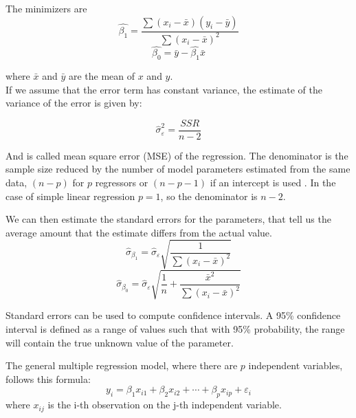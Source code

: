The minimizers are
\begin{equation}
	 \widehat{\beta_{1}} = \frac{\sum(x_i - \bar{x})(y_i - \bar{y})}{\sum(x_i - \bar{x})^2}
\end{equation}
\begin{equation}
	\widehat{\beta_{0}} = \bar{y} - \widehat{\beta_{1}} \bar {x}
\end{equation}

where $\bar{x}$ and $\bar{y}$ are the mean of $x$ and $y$.\\

If we assume that the error term has constant variance, the estimate of the variance of the error is given by:

\begin{equation}
	\widehat{\sigma}_{\varepsilon }^{2} = \frac{SSR}{n-2}
\end{equation}

And is called mean square error (MSE) of the regression. The denominator is the sample size reduced by the number of model parameters estimated from the same data, $(n-p)$ for $p$ regressors or  $(n-p-1)$ if an intercept is used \cite{MSE}. In the case of simple linear regression $p=1$, so the denominator is $n-2$.

We can then estimate the standard errors for the parameters, that tell us the average amount that the estimate differs from the actual value.
\begin{equation}
	{\widehat{\sigma}_{\beta _{1}} = {\widehat{\sigma}_{\varepsilon}{\sqrt{\frac{1}{\sum(x_{i} - {\bar {x}})^{2}}}}}}
\end{equation}
\begin{equation}
	{\widehat{\sigma}_{\beta _{0}} = {\widehat{\sigma}_{\varepsilon}{\sqrt{\frac{1}{n} + \frac{\bar{x}^2}{\sum(x_{i} - {\bar {x}})^{2}}}}}}
\end{equation}

Standard errors can be used to compute confidence intervals. A 95\% confidence interval is defined as a range of values such that with 95\% probability, the range will contain the true unknown value of the parameter.

The general multiple regression model, where there are $p$ independent variables, follows this formula:
\begin{equation}
	y_{i}=\beta_{1}x_{i1} + \beta_{2}x_{i2} + \cdots + \beta_{p}x_{ip} + \varepsilon_{i}
\end{equation}
where $x_{ij}$ is the i-th observation on the j-th independent variable.




